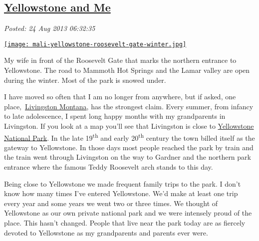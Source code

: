 %

\subsection*{\href{http://bakerjd99.wordpress.com/2013/08/24/yellowstone-and-me/}{Yellowstone and Me}}


\noindent\emph{Posted: 24 Aug 2013 06:32:35}
\vspace{6pt}




\captionsetup[floatingfigure]{labelformat=empty}
\begin{floatingfigure}[r]{0.35\textwidth}
\centering
\href{http://conceptcontrol.smugmug.com/Trips/USA-and-Canada/North-Western/i-cJMHzj5/A}{\texttt{[image: mali-yellowstone-roosevelt-gate-winter.jpg]}}
\caption{My wife in front of the Roosevelt Gate that marks the northern entrance
to Yellowstone. The road to Mammoth Hot Springs and the Lamar valley are
open during the winter. Most of the park is snowed under.}
\label{fig:4186X0}
\end{floatingfigure} I have moved so often that I am no longer from anywhere, but if asked,
one place,~\href{http://www.livingstonmontana.org/}{Livingston Montana},
has the strongest claim. Every summer, from infancy to late adolescence,
I spent long happy months with my grandparents in Livingston. If you
look at a map you'll see that Livingston is close to
\href{http://www.nps.gov/yell/index.htm}{Yellowstone National Park}. In
the late 19\textsuperscript{th} and early 20\textsuperscript{th} century
the town billed itself as the gateway to Yellowstone. In those days most
people reached the park by train and the train went through Livingston
on the way to Gardner and the northern park entrance where the famous
Teddy Roosevelt arch stands to this day.

Being close to Yellowstone we made frequent family trips to the park. I
don't know how many times I've entered Yellowstone. We'd make at least
one trip every year and some years we went two or three times. We
thought of Yellowstone as our own private national park and we were
intensely proud of the place. This hasn't changed. People that live near
the park today are as fiercely devoted to Yellowstone as my grandparents
and parents ever were.

